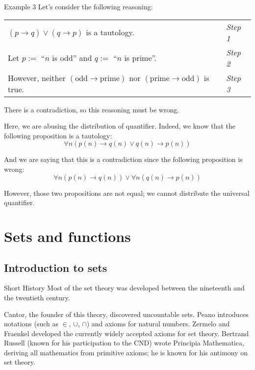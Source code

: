 \documentclass{article}
\begin{document}
\begin{parag}{Example 3}
    Let's consider the following reasoning:
    \begin{center}
    \begin{tabular}{l|l}
        $\left(p \to q\right) \lor \left(q \to p\right)$ is a tautology. & \textit{Step 1} \\
        Let $p :=$ ``$n$ is odd'' and $q :=$ ``$n$ is prime''. & \textit{Step 2} \\
        However, neither $\left(\text{odd} \to \text{prime}\right)$ nor $\left(\text{prime} \to \text{odd}\right)$ is true. & \textit{Step 3}
    \end{tabular}
    \end{center}
    
    There is a contradiction, so this reasoning must be wrong.

    Here, we are abusing the distribution of quantifier. Indeed, we know that the following proposition is a tautology: 
    \[\forall n\left(p\left(n\right) \to q\left(n\right) \lor q\left(n\right) \to p\left(n\right)\right) \]
    
    And we are saying that this is a contradiction since the following proposition is wrong:
    \[\forall n\left(p\left(n\right) \to q\left(n\right)\right) \lor \forall n\left(q\left(n\right) \to p\left(n\right)\right)\]

    However, those two propositions are not equal; we cannot distribute the universal quantifier.
\end{parag}

\section{Sets and functions}
\subsection{Introduction to sets}
\begin{parag}{Short History}
    Most of the set theory was developed between the nineteenth and the twentieth century.

    Cantor, the founder of this theory, discovered uncountable sets. Peano introduces notations (such as $\in$, $\cup$, $\cap$) and axioms for natural numbers. Zermelo and Fraenkel developed the currently widely accepted axioms for set theory. Bertrand Russell (known for his participation to the CND) wrote Principia Mathematica, deriving all mathematics from primitive axioms; he is known for his antimony on set theory.
\end{parag}
\end{document}
